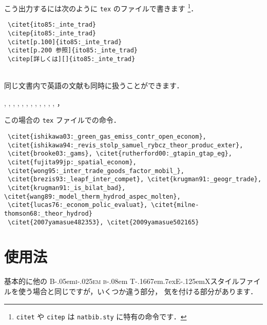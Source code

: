 \documentclass[article]{jlreq}
\newcommand{\BibTeX}{\textrm{B\kern-.05em\textsc{i\kern-.025em b}\kern-.08em%
T\kern-.1667em\lower.7ex\hbox{E}\kern-.125emX}}
\begin{document}
こう出力するには次のように \texttt{tex} のファイルで書きます
\footnote{\texttt{citet} や \texttt{citep} は \texttt{natbib.sty} に特有の命令です．}．

\begin{screen}
\begin{verbatim}
 \citet{ito85:_inte_trad}
 \citep{ito85:_inte_trad}
 \citet[p.100]{ito85:_inte_trad}
 \citet[p.200 参照]{ito85:_inte_trad}
 \citep[詳しくは][]{ito85:_inte_trad}
\end{verbatim}
\end{screen}
\\

同じ文書内で英語の文献も同時に扱うことができます．

\begin{screen}
 \citet{ishikawa03:_green_gas_emiss_contr_open_econom},
 \citet{ishikawa94:_revis_stolp_samuel_rybcz_theor_produc_exter},
 \citet{brooke03:_gams},
 \citet{rutherford00:_gtapin_gtap_eg},
 \citet{fujita99jp:_spatial_econom},
 \citet{wong95:_inter_trade_goods_factor_mobil_},
 \citet{brezis93:_leapf_inter_compet},
 \citet{krugman91:_geogr_trade},
 \citet{krugman91:_is_bilat_bad},
 \citet{wang89:_model_therm_hydrod_aspec_molten},
 \citet{lucas76:_econom_polic_evaluat},
 \citet{milne-thomson68:_theor_hydrod},
 \citet{2007yamasue482353}，
 \citet{2009yamasue502165} 
\end{screen}

この場合の \texttt{tex} ファイルでの命令．

\begin{screen}
\begin{verbatim}
 \citet{ishikawa03:_green_gas_emiss_contr_open_econom},
 \citet{ishikawa94:_revis_stolp_samuel_rybcz_theor_produc_exter},
 \citet{brooke03:_gams}, \citet{rutherford00:_gtapin_gtap_eg},
 \citet{fujita99jp:_spatial_econom},
 \citet{wong95:_inter_trade_goods_factor_mobil_},
 \citet{brezis93:_leapf_inter_compet}, \citet{krugman91:_geogr_trade},
 \citet{krugman91:_is_bilat_bad}, \citet{wang89:_model_therm_hydrod_aspec_molten},
 \citet{lucas76:_econom_polic_evaluat}, \citet{milne-thomson68:_theor_hydrod}
 \citet{2007yamasue482353}, \citet{2009yamasue502165} 
\end{verbatim}
\end{screen}

\section{使用法}

基本的に他の \BibTeX スタイルファイルを使う場合と同じですが，いくつか違う部分，
気を付ける部分があります．
\end{document}
